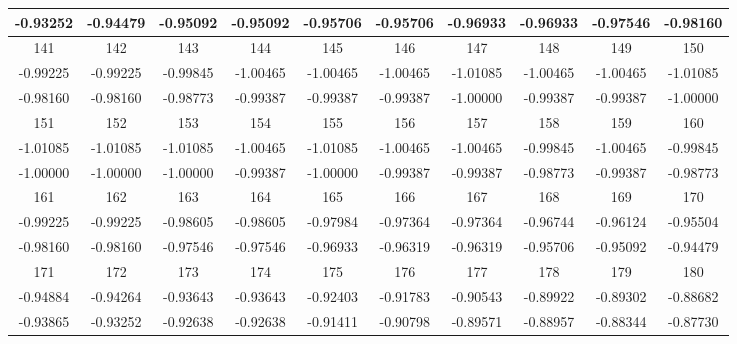 \documentclass[withoutpreface,bwprint]{cumcmthesis} %
\begin{document}
\begin{center}
\begin{longtable}{cccccccccc}
        -0.93252 & -0.94479 & -0.95092 & -0.95092 & -0.95706 & -0.95706 & -0.96933 & -0.96933 & -0.97546 & -0.98160 \\
        \hline
        141      & 142      & 143      & 144      & 145      & 146      & 147      & 148      & 149      & 150      \\
        \hline
        -0.99225 & -0.99225 & -0.99845 & -1.00465 & -1.00465 & -1.00465 & -1.01085 & -1.00465 & -1.00465 & -1.01085 \\
        -0.98160 & -0.98160 & -0.98773 & -0.99387 & -0.99387 & -0.99387 & -1.00000 & -0.99387 & -0.99387 & -1.00000 \\
        \hline
        151      & 152      & 153      & 154      & 155      & 156      & 157      & 158      & 159      & 160      \\
        \hline
        -1.01085 & -1.01085 & -1.01085 & -1.00465 & -1.01085 & -1.00465 & -1.00465 & -0.99845 & -1.00465 & -0.99845 \\
        -1.00000 & -1.00000 & -1.00000 & -0.99387 & -1.00000 & -0.99387 & -0.99387 & -0.98773 & -0.99387 & -0.98773 \\
        \hline
        161      & 162      & 163      & 164      & 165      & 166      & 167      & 168      & 169      & 170      \\
        \hline
        -0.99225 & -0.99225 & -0.98605 & -0.98605 & -0.97984 & -0.97364 & -0.97364 & -0.96744 & -0.96124 & -0.95504 \\
        -0.98160 & -0.98160 & -0.97546 & -0.97546 & -0.96933 & -0.96319 & -0.96319 & -0.95706 & -0.95092 & -0.94479 \\
        \hline
        171      & 172      & 173      & 174      & 175      & 176      & 177      & 178      & 179      & 180      \\
        \hline
        -0.94884 & -0.94264 & -0.93643 & -0.93643 & -0.92403 & -0.91783 & -0.90543 & -0.89922 & -0.89302 & -0.88682 \\
        -0.93865 & -0.93252 & -0.92638 & -0.92638 & -0.91411 & -0.90798 & -0.89571 & -0.88957 & -0.88344 & -0.87730
      \end{longtable}
    \end{center}
\end{document}
